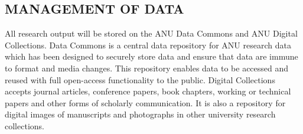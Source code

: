 \subsection*{MANAGEMENT OF DATA}

All research output will be stored on the ANU Data Commons and ANU
Digital Collections.
Data Commons is a central data repository for ANU research data which
has been designed to securely store data and ensure that data are
immune to format and media changes. This repository enables data to be
accessed and reused with full open-access functionality to the public.
Digital Collections accepts journal articles, conference papers, book
chapters, working or technical papers and other forms of scholarly
communication. It is also a repository for digital images of
manuscripts and photographs in other university research collections.

